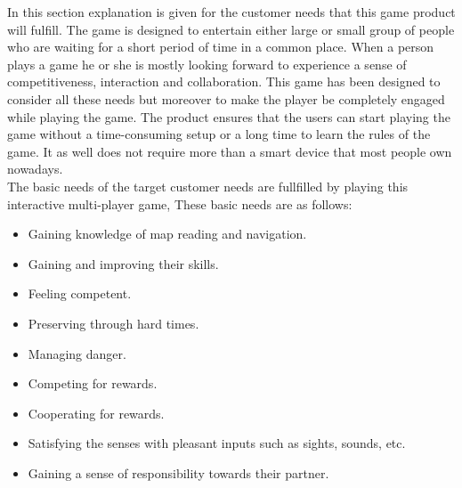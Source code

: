 

In this section explanation is given for the customer needs that this game product will fulfill. The game is designed to entertain either large or small group of people who are waiting for a short period of time in a common place. When a person plays a game he or she is mostly looking forward to experience a sense of competitiveness, interaction and collaboration. This game has been designed to consider all these needs but moreover to make the player be completely engaged while playing the game. The product ensures that the users can start playing the game without a time-consuming setup or a long time to learn the rules of the game. It as well does not require more than a smart device that most people own nowadays. 
\\The basic needs of the target customer needs are fullfilled by playing this interactive multi-player game, These basic needs are as follows:
 \begin{itemize}
   	\item Gaining knowledge of map reading and navigation.
   	\item Gaining and improving their skills.
   	\item Feeling competent.
   	\item Preserving through hard times.
   	\item Managing danger.
   	\item Competing for rewards.
   	\item Cooperating for rewards.
   	\item Satisfying the senses with pleasant inputs such as sights, sounds, etc.
   	\item Gaining a sense of responsibility towards their partner.
\end{itemize}  


     
